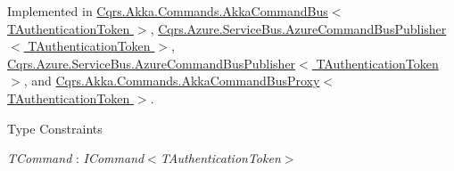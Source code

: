 Implemented in \hyperlink{classCqrs_1_1Akka_1_1Commands_1_1AkkaCommandBus_ab52365375febd74ac078e97af6e6cd24}{Cqrs.\+Akka.\+Commands.\+Akka\+Command\+Bus$<$ T\+Authentication\+Token $>$}, \hyperlink{classCqrs_1_1Azure_1_1ServiceBus_1_1AzureCommandBusPublisher_a072f18c8709e0ae61056e34251afc506}{Cqrs.\+Azure.\+Service\+Bus.\+Azure\+Command\+Bus\+Publisher$<$ T\+Authentication\+Token $>$}, \hyperlink{classCqrs_1_1Azure_1_1ServiceBus_1_1AzureCommandBusPublisher_a072f18c8709e0ae61056e34251afc506}{Cqrs.\+Azure.\+Service\+Bus.\+Azure\+Command\+Bus\+Publisher$<$ T\+Authentication\+Token $>$}, and \hyperlink{classCqrs_1_1Akka_1_1Commands_1_1AkkaCommandBusProxy_a81dc8162ca933d84b6aee04aff589010}{Cqrs.\+Akka.\+Commands.\+Akka\+Command\+Bus\+Proxy$<$ T\+Authentication\+Token $>$}.

\begin{Desc}
\item[Type Constraints]\begin{description}
\item[{\em T\+Command} : {\em I\+Command$<$T\+Authentication\+Token$>$}]\end{description}
\end{Desc}
